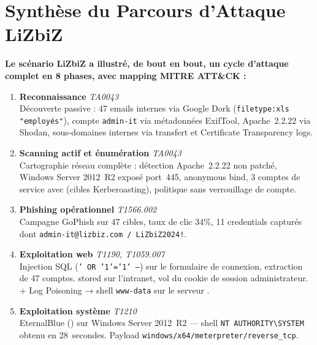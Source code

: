 \section*{Synthèse du Parcours d'Attaque LiZbiZ}

\begin{boxresume}
\textbf{Le scénario LiZbiZ a illustré, de bout en bout, un cycle d'attaque
complet en 8 phases, avec mapping MITRE ATT\&CK :}

\begin{enumerate}
    \item \textbf{Reconnaissance } \hfill \textit{TA0043}\\
          Découverte passive : 47 emails internes via Google Dork
          (\texttt{filetype:xls "employés"}), compte \texttt{admin-it}
          via métadonnées ExifTool, Apache~2.2.22 via Shodan, sous-domaines
          internes via transfert  et Certificate Transparency logs.

    \item \textbf{Scanning actif et énumération} \hfill \textit{TA0043}\\
          Cartographie réseau complète : détection Apache~2.2.22 non patché,
          Windows Server 2012~R2 exposé port~445,  anonymous bind,
          3 comptes de service avec  (cibles Kerberoasting),
          politique sans verrouillage de compte.

    \item \textbf{Phishing opérationnel} \hfill \textit{T1566.002}\\
          Campagne GoPhish sur 47 cibles, taux de clic 34\%, 11 credentials
          capturés dont \texttt{admin-it@lizbiz.com / LiZbiZ2024!}.

    \item \textbf{Exploitation web} \hfill \textit{T1190, T1059.007}\\
          Injection SQL (\texttt{' OR '1'='1' --}) sur le formulaire de
          connexion, extraction de 47 comptes.  stored sur
          l'intranet, vol du cookie de session administrateur. 
          + Log Poisoning → shell \texttt{www-data} sur le serveur .

    \item \textbf{Exploitation système} \hfill \textit{T1210}\\
          EternalBlue () sur Windows Server 2012~R2 —
          shell \texttt{NT AUTHORITY\textbackslash{}SYSTEM} obtenu en 28~secondes.
          Payload \texttt{windows/x64/meterpreter/reverse\_tcp}.


\end{enumerate}
\end{boxresume}
